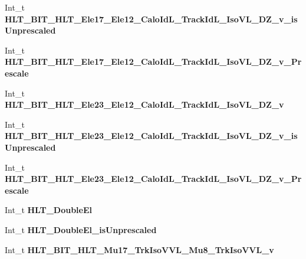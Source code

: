 \begin{DoxyCompactItemize}
\item 
\hypertarget{classMiniTree_aaf042e80708957d895d69fe9f255760e}{}\label{classMiniTree_aaf042e80708957d895d69fe9f255760e} 
Int\+\_\+t {\bfseries H\+L\+T\+\_\+\+B\+I\+T\+\_\+\+H\+L\+T\+\_\+\+Ele17\+\_\+\+Ele12\+\_\+\+Calo\+Id\+L\+\_\+\+Track\+Id\+L\+\_\+\+Iso\+V\+L\+\_\+\+D\+Z\+\_\+v\+\_\+is\+Unprescaled}
\item 
\hypertarget{classMiniTree_a4547927e9ec5ef33eee15da79030342e}{}\label{classMiniTree_a4547927e9ec5ef33eee15da79030342e} 
Int\+\_\+t {\bfseries H\+L\+T\+\_\+\+B\+I\+T\+\_\+\+H\+L\+T\+\_\+\+Ele17\+\_\+\+Ele12\+\_\+\+Calo\+Id\+L\+\_\+\+Track\+Id\+L\+\_\+\+Iso\+V\+L\+\_\+\+D\+Z\+\_\+v\+\_\+\+Prescale}
\item 
\hypertarget{classMiniTree_a2fe4841194095f6ec7b6b8485106bcf2}{}\label{classMiniTree_a2fe4841194095f6ec7b6b8485106bcf2} 
Int\+\_\+t {\bfseries H\+L\+T\+\_\+\+B\+I\+T\+\_\+\+H\+L\+T\+\_\+\+Ele23\+\_\+\+Ele12\+\_\+\+Calo\+Id\+L\+\_\+\+Track\+Id\+L\+\_\+\+Iso\+V\+L\+\_\+\+D\+Z\+\_\+v}
\item 
\hypertarget{classMiniTree_a04218d25afcf5c571be8ca9520f640a9}{}\label{classMiniTree_a04218d25afcf5c571be8ca9520f640a9} 
Int\+\_\+t {\bfseries H\+L\+T\+\_\+\+B\+I\+T\+\_\+\+H\+L\+T\+\_\+\+Ele23\+\_\+\+Ele12\+\_\+\+Calo\+Id\+L\+\_\+\+Track\+Id\+L\+\_\+\+Iso\+V\+L\+\_\+\+D\+Z\+\_\+v\+\_\+is\+Unprescaled}
\item 
\hypertarget{classMiniTree_a4e1157ffa3c86618e6c83fcf1a5e4ce0}{}\label{classMiniTree_a4e1157ffa3c86618e6c83fcf1a5e4ce0} 
Int\+\_\+t {\bfseries H\+L\+T\+\_\+\+B\+I\+T\+\_\+\+H\+L\+T\+\_\+\+Ele23\+\_\+\+Ele12\+\_\+\+Calo\+Id\+L\+\_\+\+Track\+Id\+L\+\_\+\+Iso\+V\+L\+\_\+\+D\+Z\+\_\+v\+\_\+\+Prescale}
\item 
\hypertarget{classMiniTree_a2c3b615cc4cd443eb4d102c69d18221e}{}\label{classMiniTree_a2c3b615cc4cd443eb4d102c69d18221e} 
Int\+\_\+t {\bfseries H\+L\+T\+\_\+\+Double\+El}
\item 
\hypertarget{classMiniTree_a0741efe3c2072b053083eeec56f5e4a7}{}\label{classMiniTree_a0741efe3c2072b053083eeec56f5e4a7} 
Int\+\_\+t {\bfseries H\+L\+T\+\_\+\+Double\+El\+\_\+is\+Unprescaled}
\item 
\hypertarget{classMiniTree_ade04a545eab678b0247d930eb42b681b}{}\label{classMiniTree_ade04a545eab678b0247d930eb42b681b} 
Int\+\_\+t {\bfseries H\+L\+T\+\_\+\+B\+I\+T\+\_\+\+H\+L\+T\+\_\+\+Mu17\+\_\+\+Trk\+Iso\+V\+V\+L\+\_\+\+Mu8\+\_\+\+Trk\+Iso\+V\+V\+L\+\_\+v}
\item 
\hypertarget{classMiniTree_a854ef90830008e0b71cb0e1ccb81176f}{}\label{classMiniTree_a854ef90830008e0b71cb0e1ccb81176f} 

\end{DoxyCompactItemize}
